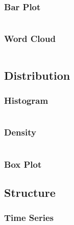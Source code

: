 \documentclass[11pt, a4paper, oneside]{report}
\begin{document}
\subsubsection{Bar Plot}\label{sec:bar-plot}

\inputminted[frame=lines,fontsize=\scriptsize,xleftmargin=\parindent,linenos]{R}{R/barplot.R}

\subsubsection{Word Cloud}\label{sec:word-cloud}

\inputminted[frame=lines,fontsize=\scriptsize,xleftmargin=\parindent,linenos]{R}{R/wordcloud.R}

\subsection{Distribution}\label{sec:distribution}

\subsubsection{Histogram}\label{sec:histogram}

\inputminted[frame=lines,fontsize=\scriptsize,xleftmargin=\parindent,linenos]{R}{R/histogram.R}

\subsubsection{Density}\label{sec:density}

\inputminted[frame=lines,fontsize=\scriptsize,xleftmargin=\parindent,linenos]{R}{R/density.R}

\subsubsection{Box Plot}\label{sec:box-plot}

\subsection{Structure}\label{sec:structure}

\subsubsection{Time Series}\label{sec:time-series}
\end{document}
